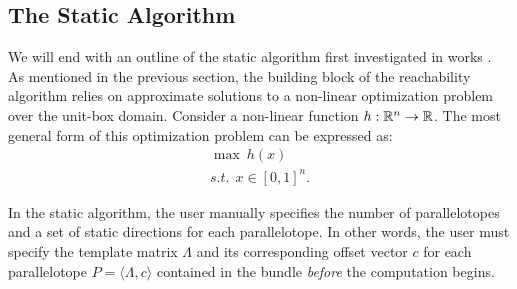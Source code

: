 \subsection{The Static Algorithm}
\label{sec:static}

We will end with an outline of the static algorithm first investigated in works \cite{dang2012reachability, dreossi2016parallelotope}. As mentioned in the previous section, the building block of the reachability algorithm relies on approximate solutions to a non-linear optimization problem over the unit-box domain. Consider a non-linear function $h : {\mathbb{R}}^n \rightarrow {\mathbb{R}}$. The most general form of this optimization problem can be expressed as:
%
\begin{eqnarray}
  \max ~ h(x) \label{eq:maxsup}\\
  s.t. ~~ x \in [0,1]^{n}.\nonumber
\end{eqnarray}

In the static algorithm, the user manually specifies the number of parallelotopes and a set of static directions for each parallelotope. In other words, the user must specify the template matrix $\Lambda$ and its corresponding offset vector $c$ for each parallelotope $P = \langle \Lambda, c\rangle$ contained in the bundle \emph{before} the computation begins.

